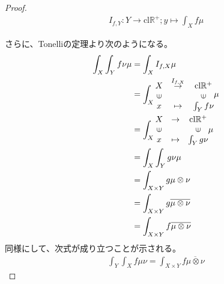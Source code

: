 \documentclass[dvipdfmx]{jsarticle}
\begin{document}
\begin{proof}
\begin{align*}
I_{f,Y}:Y \rightarrow \mathrm{cl}\mathbb{R}^{+};y \mapsto \int_{X} {f\mu}
\end{align*}\par
さらに、Tonelliの定理より次のようになる。
\begin{align*}
\int_{X} {\int_{Y} {f\nu}\mu} &= \int_{X} {I_{f,X}\mu}\\
&= \int_{X} {\begin{matrix}
X & \overset{I_{f,X}}{\rightarrow} & \mathrm{cl}\mathbb{R}^{+} \\
\text{\rotatebox[origin=c]{90}{$\in$}} & & \text{\rotatebox[origin=c]{90}{$\in$}} \\
x & \mapsto & \int_{Y} {f\nu} \\
\end{matrix}\mu}\\
&= \int_{X} {\begin{matrix}
X & \rightarrow & \mathrm{cl}\mathbb{R}^{+} \\
\text{\rotatebox[origin=c]{90}{$\in$}} & & \text{\rotatebox[origin=c]{90}{$\in$}} \\
x & \mapsto & \int_{Y} {g\nu} \\
\end{matrix}\mu}\\
&= \int_{X} {\int_{Y} {g\nu}\mu}\\
&= \int_{X \times Y} {g\mu \otimes \nu}\\
&= \int_{X \times Y} {g\overline{\mu \otimes \nu}}\\
&= \int_{X \times Y} {f\overline{\mu \otimes \nu}}
\end{align*}
同様にして、次式が成り立つことが示される。
\begin{align*}
\int_{Y} {\int_{X} {f\mu}\nu} = \int_{X \times Y} {f\overline{\mu \otimes \nu}}
\end{align*}
\end{proof}
\end{document}
